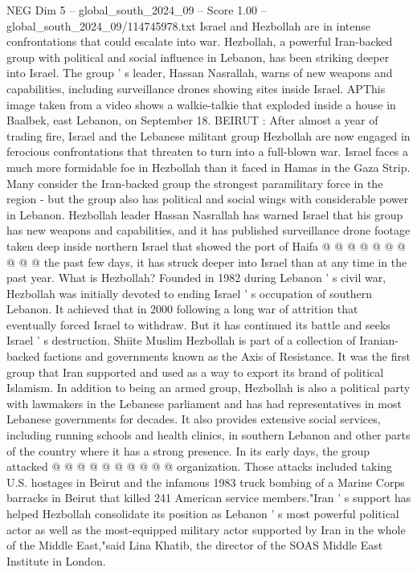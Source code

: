 \begin{textsample}{NEG Dim 5 – global\_south\_2024\_09 – Score 1.00 – global\_south\_2024\_09/114745978.txt}  \label{ex:f5_neg_228}
Israel and Hezbollah are in intense confrontations that could escalate into war.
Hezbollah, a powerful Iran-backed group with political and social influence in Lebanon, has been striking deeper into Israel.
The group ' s leader, Hassan Nasrallah, warns of new weapons and capabilities, including surveillance drones showing sites inside Israel.
APThis image taken from a video shows a walkie-talkie that exploded inside a house in Baalbek, east Lebanon, on September 18.
BEIRUT : After almost a year of trading fire, Israel and the Lebanese militant group Hezbollah are now engaged in ferocious confrontations that threaten to turn into a full-blown war.
Israel faces a much more formidable foe in Hezbollah than it faced in Hamas in the Gaza Strip.
Many consider the Iran-backed group the strongest paramilitary force in the region - but the group also has political and social wings with considerable power in Lebanon.
Hezbollah leader Hassan Nasrallah has warned Israel that his group has new weapons and capabilities, and it has published surveillance drone footage taken deep inside northern Israel that showed the port of Haifa @ @ @ @ @ @ @ @ @ @ the past few days, it has struck deeper into Israel than at any time in the past year.
What is Hezbollah?
Founded in 1982 during Lebanon ' s civil war, Hezbollah was initially devoted to ending Israel ' s occupation of southern Lebanon.
It achieved that in 2000 following a long war of attrition that eventually forced Israel to withdraw.
But it has continued its battle and seeks Israel ' s destruction.
Shiite Muslim Hezbollah is part of a collection of Iranian-backed factions and governments known as the Axis of Resistance.
It was the first group that Iran supported and used as a way to export its brand of political Islamism.
In addition to being an armed group, Hezbollah is also a political party with lawmakers in the Lebanese parliament and has had representatives in most Lebanese governments for decades.
It also provides extensive social services, including running schools and health clinics, in southern Lebanon and other parts of the country where it has a strong presence.
In its early days, the group attacked @ @ @ @ @ @ @ @ @ @ organization.
Those attacks included taking U.S. hostages in Beirut and the infamous 1983 truck bombing of a Marine Corps barracks in Beirut that killed 241 American service members."Iran ' s support has helped Hezbollah consolidate its position as Lebanon ' s most powerful political actor as well as the most-equipped military actor supported by Iran in the whole of the Middle East,"said Lina Khatib, the director of the SOAS Middle East Institute in London.

\end{textsample}
